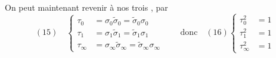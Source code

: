 On peut maintenant revenir à nos trois ,  par
\[
(15)\quad\left\{\begin{aligned}
\tau_0&=\sigma_0\tilde\sigma_0=\tilde\sigma_0\sigma_0\\
\tau_1&=\sigma_1\tilde\sigma_1=\tilde\sigma_1\sigma_1\\
\tau_\infty&=\sigma_\infty\tilde\sigma_\infty=\tilde\sigma_\infty\sigma_\infty
\end{aligned}\right.
\qquad\text{donc}\quad(16)\left\{\begin{aligned}
\tau_0^2&=1\\\tau_1^2&=1\\\tau_\infty^2&=1
\end{aligned}\right.
\]
